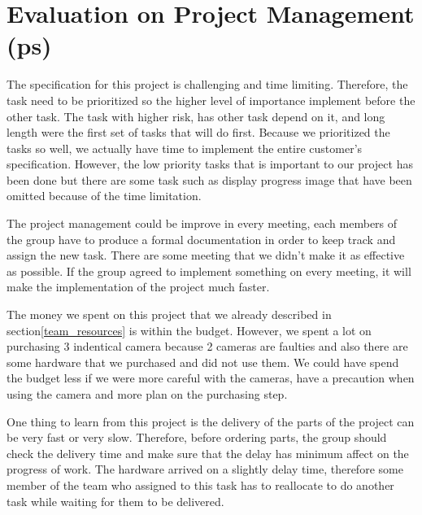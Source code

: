 \section{Evaluation on Project Management (ps)}

The specification for this project is challenging and time limiting.
Therefore, the task need to be prioritized so the higher level of importance implement before the other task.
The task with higher risk, has other task depend on it, and long length were the first set of tasks that will do first.
Because we prioritized the tasks so well, we actually have time to implement the entire customer's specification.
However, the low priority tasks that is important to our project has been done but there are some task such as display progress image that have been omitted because of the time limitation.

The project management could be improve in every meeting, each members of the group have to produce a formal documentation in order to keep track and assign the new task.
There are some meeting that we didn't make it as effective as possible.
If the group agreed to implement something on every meeting, it will make the implementation of the project much faster. 

The money we spent on this project that we already described in section\ref{team_resources} is within the budget.
However, we spent a lot on purchasing 3 indentical camera because 2 cameras are faulties and also there are some hardware that we purchased and did not use them.
We could have spend the budget less if we were more careful with the cameras, have a precaution when using the camera and more plan on the purchasing step.

One thing to learn from this project is the delivery of the parts of the project can be very fast or very slow. 
Therefore, before ordering parts, the group should check the delivery time and make sure that the delay has minimum affect on the progress of work.
The hardware arrived on a slightly delay time, therefore some member of the team who assigned to this task has to reallocate to do another task while waiting for them to be delivered.














